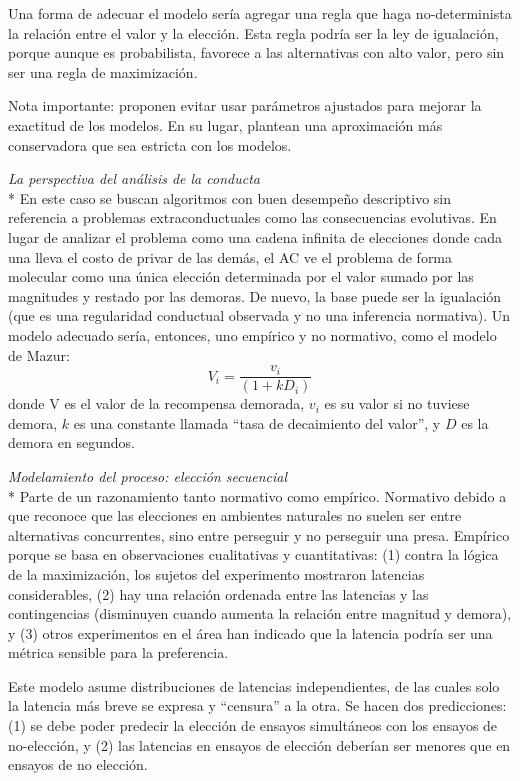 \documentclass[a4paper,12pt]{article}
\begin{document}
Una forma de adecuar el modelo sería agregar una regla que haga no-determinista la relación entre el valor y la elección. Esta regla podría ser la ley de igualación, porque aunque es probabilista, favorece a las alternativas con alto valor, pero sin ser una regla de maximización.

Nota importante: proponen evitar usar parámetros ajustados para mejorar la exactitud de los modelos. En su lugar, plantean una aproximación más conservadora que sea estricta con los modelos.

{\slshape La perspectiva del análisis de la conducta}\\*
En este caso se buscan algoritmos con buen desempeño descriptivo sin referencia a problemas extraconductuales como las consecuencias evolutivas. En lugar de analizar el problema como una cadena infinita de elecciones donde cada una lleva el costo de privar de las demás, el AC ve el problema de forma molecular como una única elección determinada por el valor sumado por las magnitudes y restado por las demoras.
De nuevo, la base puede ser la igualación (que es una regularidad conductual observada y no una inferencia normativa). Un modelo adecuado sería, entonces, uno empírico y no normativo, como el modelo de Mazur: $$V_i=\frac{v_i}{(1+kD_i)}$$ donde V es el valor de la recompensa demorada, $v_i$ es su valor si no tuviese demora, $k$ es una constante llamada ``tasa de decaimiento del valor'', y $D$ es la demora en segundos.

{\slshape Modelamiento del proceso: elección secuencial}\\*
Parte de un razonamiento tanto normativo como empírico. Normativo debido a que reconoce que las elecciones en ambientes naturales no suelen ser entre alternativas concurrentes, sino entre perseguir y no perseguir una presa. Empírico porque se basa en observaciones cualitativas y cuantitativas: (1) contra la lógica de la maximización, los sujetos del experimento mostraron latencias considerables, (2) hay una relación ordenada entre las latencias y las contingencias (disminuyen cuando aumenta la relación entre magnitud y demora), y (3) otros experimentos en el área han indicado que la latencia podría ser una métrica  sensible para la preferencia.

Este modelo asume distribuciones de latencias independientes, de las cuales solo la latencia más breve se expresa y ``censura'' a la otra. Se hacen dos predicciones: (1) se debe poder predecir la elección de ensayos simultáneos con los ensayos de no-elección, y (2) las latencias en ensayos de elección deberían ser menores que en ensayos de no elección.
\end{document}
